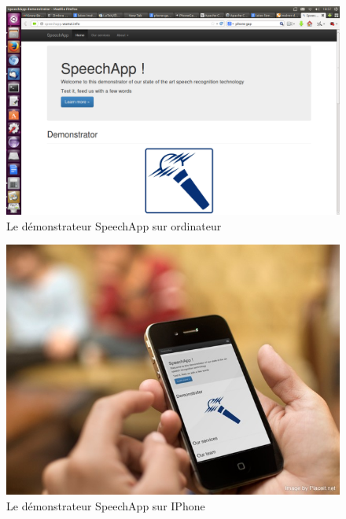 \documentclass[a4paper,12pt]{report}
\begin{document}
\begin{figure}[H]
	\begin{center}
	\includegraphics[width=14cm]{pics/speechapp-desktop.png} 
	\end{center}
	\caption{Le démonstrateur SpeechApp sur ordinateur}
\end{figure}


\begin{figure}[H]
	\begin{center}
	\includegraphics[width=14cm]{pics/speechapp-iphone.png} 
	\end{center}
	\caption{Le démonstrateur SpeechApp sur IPhone}
\end{figure}
\end{document}
